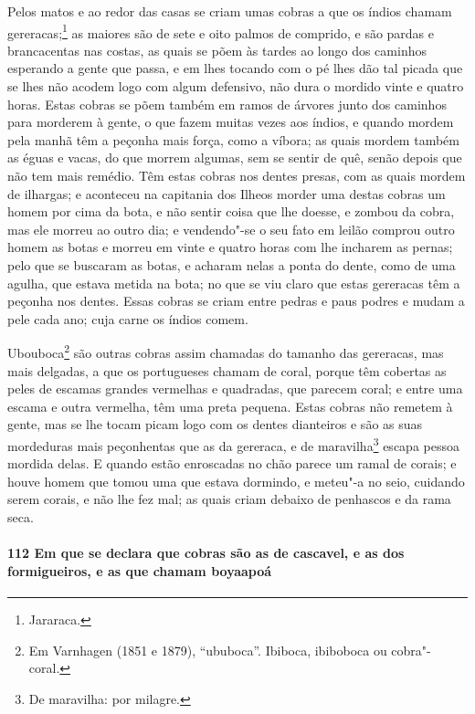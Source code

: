Pelos matos e ao redor das casas se criam umas cobras a que os índios chamam
gereracas;\footnote{ Jararaca.} as maiores são de sete e oito palmos de comprido, e são
pardas e brancacentas nas costas, as quais se põem às tardes ao longo dos caminhos
esperando a gente que passa, e em lhes tocando com o pé lhes dão tal picada que se lhes
não acodem logo com algum defensivo, não dura o mordido vinte e quatro horas. Estas cobras
se põem também em ramos de árvores junto dos caminhos para morderem à gente, o que fazem
muitas vezes aos índios, e quando mordem pela manhã têm a peçonha mais força, como a
víbora; as quais mordem também as éguas e vacas, do que morrem algumas, sem se sentir de
quê, senão depois que não tem mais remédio. Têm estas cobras nos dentes presas, com as
quais mordem de ilhargas; e aconteceu na capitania dos Ilheos morder uma destas cobras um
homem por cima da bota, e não sentir coisa que lhe doesse, e zombou da cobra, mas ele
morreu ao outro dia; e vendendo"-se o seu fato em leilão comprou outro homem as botas e
morreu em vinte e quatro horas com lhe incharem as pernas; pelo que se buscaram as botas, e
acharam nelas a ponta do dente, como de uma agulha, que estava metida na bota; no que se
viu claro que estas gereracas têm a peçonha nos dentes. Essas cobras se criam entre pedras
e paus podres e mudam a pele cada ano; cuja carne os índios comem.

Ubouboca\footnote{ Em Varnhagen (1851 e 1879), ``ububoca''. Ibiboca, ibiboboca ou
cobra"-coral.} são outras cobras assim chamadas do tamanho das gereracas, mas mais
delgadas, a que os portugueses chamam de coral, porque têm cobertas as peles de escamas
grandes vermelhas e quadradas, que parecem coral; e entre uma
escama e outra vermelha, têm uma preta pequena. Estas cobras não remetem à gente, mas se
lhe tocam picam logo com os dentes dianteiros e são as suas mordeduras mais peçonhentas
que as da gereraca, e de maravilha\footnote{ De maravilha: por milagre.} escapa pessoa
mordida delas. E quando estão enroscadas no chão parece um ramal de corais; e houve homem
que tomou uma que estava dormindo, e meteu"-a no seio, cuidando serem corais, e não lhe fez
mal; as quais criam debaixo de penhascos e da rama seca.

\paragraph{112 Em que se declara que cobras são as de cascavel, e as dos formigueiros, e
as que chamam boyaapoá}

